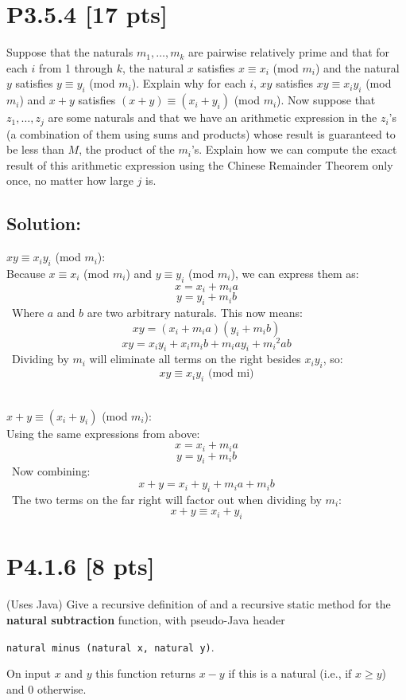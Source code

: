 \documentclass[12pt]{article}
\begin{document}
\section*{\textbf{P3.5.4} [17 pts]}
Suppose that the naturals $m_1, \ldots, m_k$ are pairwise relatively prime and that for each $i$ from 1 through $k$, the natural $x$ satisfies $x \equiv x_i$ (mod $m_i$) and the natural $y$ satisfies $y \equiv y_i$ (mod $m_i$). Explain why for each $i$, $xy$ satisfies $xy \equiv x_iy_i$ (mod $m_i$) and $x + y$ satisfies $(x + y) \equiv (x_i + y_i)$ (mod $m_i$). Now suppose that $z_1, \ldots, z_j$ are some naturals and that we have an arithmetic expression in the $z_i$’s (a combination of them using sums and products) whose result is guaranteed to be less than $M$, the product of the $m_i$’s. Explain how we can compute the exact result of this arithmetic expression using the Chinese Remainder Theorem only once, no matter how large $j$ is.



\subsection*{\textbf{Solution:}}
$xy \equiv x_iy_i$ (mod $m_i$):\\

Because $x \equiv x_i$ (mod $m_i$) and $y \equiv y_i$ (mod $m_i$), we can express them as:
\[ x = x_i + m_i a \]
\[ y = y_i + m_i b \]
\quad ~Where $a$ and $b$ are two arbitrary naturals. This now means:
\[ xy = (x_i + m_i a)(y_i + m_i b) \]
\[ xy = x_iy_i + x_im_ib + m_iay_i + {m_i}^{2}ab \]
\quad ~Dividing by $m_i$ will eliminate all terms on the right besides $x_iy_i$, so:
\[ xy \equiv x_iy_i \text{ (mod mi)} \]

~\\$x+y \equiv (x_i + y_i)$ (mod $m_i$):\\

Using the same expressions from above:
\[ x = x_i + m_i a \]
\[ y = y_i + m_i b \]
\quad ~Now combining:
\[ x+y =  x_i + y_i + m_i a + m_i b \]
\quad ~The two terms on the far right will factor out when dividing by $m_i$:
\[ x+y \equiv  x_i + y_i \]


\newpage
\section*{\textbf{P4.1.6} [8 pts]}
(Uses Java) Give a recursive definition of and a recursive static method for the \textbf{natural subtraction} function, with pseudo-Java header
\begin{center}
    \texttt{natural minus (natural x, natural y)}.
\end{center}
On input $x$ and $y$ this function returns $x-y$ if this is a natural (i.e., if $x \geq y$) and 0 otherwise.
\end{document}
